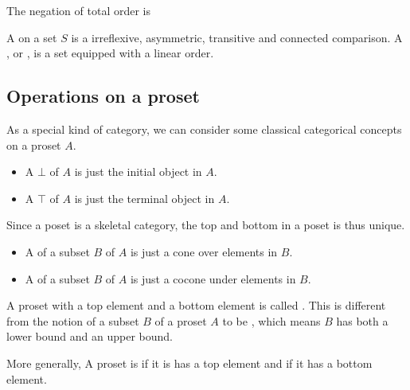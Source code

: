   The negation of total order is
  \begin{defn}
    A  on a set $S$ is a irreflexive, asymmetric, transitive and connected comparison.	 A , or , is a set equipped with a linear order.
  \end{defn}

\subsection{Operations on a proset}
  As a special kind of category, we can consider some classical categorical concepts on a proset $A$.
  \begin{itemize}
    \item A  $\bot$ of $A$ is just the initial object in $A$.
    \item A  $\top$ of $A$ is just the terminal object in $A$.
  \end{itemize}
  \begin{rem}
    Since a poset is a skeletal category, the top and bottom in a poset is thus unique.
  \end{rem}
  
  \begin{itemize}
    \item A  of a subset $B$ of $A$ is just a cone over elements in $B$.
    \item A  of a subset $B$ of $A$ is just a cocone under elements in $B$.
  \end{itemize}

  A proset with a top element and a bottom element is called . This is different from the notion of a subset $B$ of a proset $A$ to be , which means $B$ has both a lower bound and an upper bound.

  More generally, A proset is  if it is has a top element and  if it has a bottom element.
  
